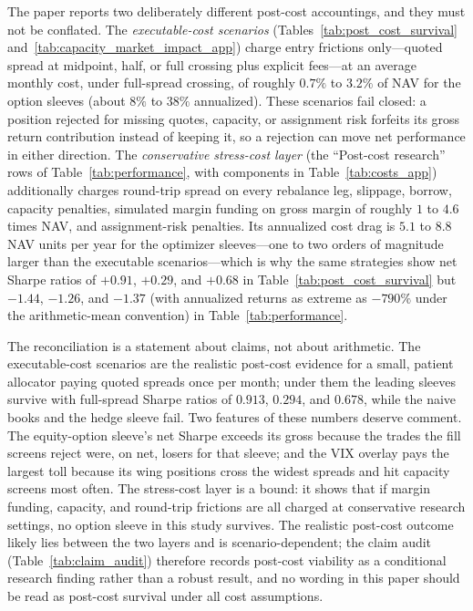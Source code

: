 The paper reports two deliberately different post-cost accountings, and they must not be
conflated. The \emph{executable-cost scenarios}
(Tables~\ref{tab:post_cost_survival} and~\ref{tab:capacity_market_impact_app}) charge
entry frictions only---quoted spread at midpoint, half, or full crossing plus explicit
fees---at an average monthly cost, under full-spread crossing, of roughly \(0.7\%\) to
\(3.2\%\) of NAV for the option sleeves (about \(8\%\) to \(38\%\) annualized). These
scenarios fail closed: a position rejected for missing quotes, capacity, or
assignment risk forfeits its gross return contribution instead of keeping it, so a
rejection can move net performance in either direction. The
\emph{conservative stress-cost layer} (the ``Post-cost research'' rows of
Table~\ref{tab:performance}, with components in Table~\ref{tab:costs_app}) additionally
charges round-trip spread on every rebalance leg, slippage, borrow, capacity penalties,
simulated margin funding on gross margin of roughly \(1\) to \(4.6\) times NAV, and
assignment-risk penalties. Its annualized cost drag is \(5.1\) to \(8.8\) NAV units per
year for the optimizer sleeves---one to two orders of magnitude larger than the executable
scenarios---which is why the same strategies show net Sharpe ratios of \(+0.91\),
\(+0.29\), and \(+0.68\) in Table~\ref{tab:post_cost_survival} but \(-1.44\), \(-1.26\),
and \(-1.37\) (with annualized returns as extreme as \(-790\%\) under the
arithmetic-mean convention) in Table~\ref{tab:performance}.

The reconciliation is a statement about claims, not about arithmetic. The executable-cost
scenarios are the realistic post-cost evidence for a small, patient allocator paying
quoted spreads once per month; under them the leading sleeves survive with full-spread
Sharpe ratios of \(0.913\), \(0.294\), and \(0.678\), while the naive books and the hedge
sleeve fail. Two features of these numbers deserve comment. The equity-option sleeve's
net Sharpe exceeds its gross because the trades the fill screens reject were, on net,
losers for that sleeve; and the VIX overlay pays the largest toll because its wing
positions cross the widest spreads and hit capacity screens most often. The stress-cost
layer is a bound: it shows that if margin funding, capacity,
and round-trip frictions are all charged at conservative research settings, no option
sleeve in this study survives. The realistic post-cost outcome likely lies between the two
layers and is scenario-dependent; the claim audit (Table~\ref{tab:claim_audit}) therefore records
post-cost viability as a conditional research finding rather than a robust result, and no
wording in this paper should be read as post-cost survival under all cost assumptions.

